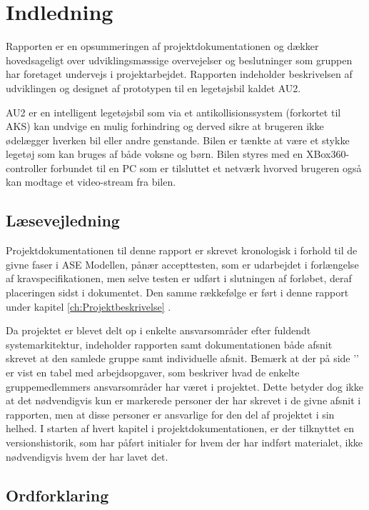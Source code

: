 \chapter{Indledning}
\label{ch:Indledning}
Rapporten er en opsummeringen af projektdokumentationen og dækker hovedsageligt over udviklingsmæssige overvejelser og beslutninger som gruppen har foretaget undervejs i projektarbejdet. 
Rapporten indeholder beskrivelsen af udviklingen og designet af prototypen til en legetøjsbil kaldet AU2.

AU2 er en intelligent legetøjsbil som via et antikollisionssystem (forkortet til AKS) kan undvige en mulig forhindring og derved sikre at brugeren ikke ødelægger hverken bil eller andre genstande. Bilen er tænkte at være et stykke legetøj som kan bruges af både voksne og børn. Bilen styres med en XBox360-controller forbundet til en PC som er tilsluttet et netværk hvorved brugeren også kan modtage et video-stream fra bilen.


\section{Læsevejledning}
Projektdokumentationen til denne rapport er skrevet kronologisk i forhold til de givne faser i ASE Modellen\cite{lib:vejledning}, pånær accepttesten, som er udarbejdet i forlængelse af kravspecifikationen, men selve testen er udført i slutningen af forløbet, deraf placeringen sidst i dokumentet.
Den samme rækkefølge er ført i denne rapport under kapitel \ref{ch:Projektbeskrivelse} .

Da projektet er blevet delt op i enkelte ansvarsområder efter fuldendt systemarkitektur, indeholder rapporten samt dokumentationen både afsnit skrevet at den samlede gruppe samt individuelle afsnit.
Bemærk at der på side '\pageref{ch:arbejdsopgaver}' er vist en tabel med arbejdsopgaver, som beskriver hvad de enkelte gruppemedlemmers ansvarsområder har været i projektet. 
Dette betyder dog ikke at det nødvendigvis kun er markerede personer der har skrevet i de givne afsnit i rapporten, men at disse personer er ansvarlige for den del af projektet i sin helhed.
I starten af hvert kapitel i projektdokumentationen, er der tilknyttet en versionshistorik, som har påført initialer for hvem der har indført materialet, ikke nødvendigvis hvem der har lavet det.

\clearpage

\section{Ordforklaring}

